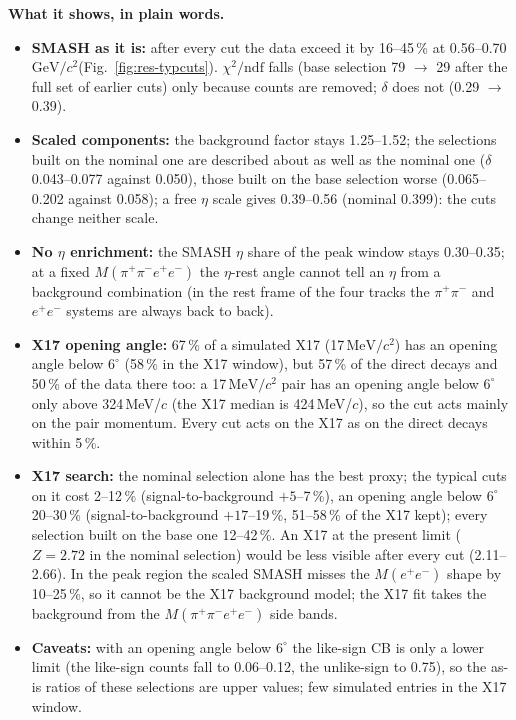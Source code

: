 \documentclass[11pt,a4paper]{article}
\newcommand{\ee}{\ensuremath{e^{+}e^{-}}\xspace}
\newcommand{\pipi}{\ensuremath{\pi^{+}\pi^{-}}\xspace}
\newcommand{\Mfour}{\ensuremath{M(\pi^{+}\pi^{-}e^{+}e^{-})}\xspace}
\newcommand{\Mee}{\ensuremath{M(e^{+}e^{-})}\xspace}
\newcommand{\GeVcc}{\ensuremath{\mathrm{GeV}/c^{2}}\xspace}
\newcommand{\MeVcc}{\ensuremath{\mathrm{MeV}/c^{2}}\xspace}
\begin{document}
\textbf{What it shows, in plain words.}
\begin{itemize}\setlength{\itemsep}{0pt}
\item \textbf{SMASH as it is:} after every cut the data exceed it by 16--45\,\% at 0.56--0.70\,\GeVcc (Fig.~\ref{fig:res-typcuts}). $\chi^2/\mathrm{ndf}$
      falls (base selection 79 $\to$ 29 after the full set of earlier cuts) only because counts are removed; $\delta$ does not (0.29 $\to$ 0.39).
\item \textbf{Scaled components:} the background factor stays 1.25--1.52; the selections built on the nominal one are described about as well as
      the nominal one ($\delta$ 0.043--0.077 against 0.050), those built on the base selection worse (0.065--0.202 against 0.058); a free $\eta$
      scale gives 0.39--0.56 (nominal 0.399): the cuts change neither scale.
\item \textbf{No $\eta$ enrichment:} the SMASH $\eta$ share of the peak window stays 0.30--0.35; at a fixed \Mfour the $\eta$-rest angle cannot tell an
      $\eta$ from a background combination (in the rest frame of the four tracks the \pipi and \ee systems are always back to back).
\item \textbf{X17 opening angle:} 67\,\% of a simulated X17 (17\,\MeVcc) has an opening angle below $6^\circ$ (58\,\% in the X17 window), but 57\,\% of
      the direct decays and 50\,\% of the data there too: a 17\,\MeVcc pair has an opening angle below $6^\circ$ only above 324\,MeV/$c$ (the X17
      median is 424\,MeV/$c$), so the cut acts mainly on the pair momentum. Every cut acts on the X17 as on the direct decays within 5\,\%.
\item \textbf{X17 search:} the nominal selection alone has the best proxy; the typical cuts on it cost 2--12\,\% (signal-to-background $+5$--7\,\%),
      an opening angle below $6^\circ$ 20--30\,\% (signal-to-background $+17$--19\,\%, 51--58\,\% of the X17 kept); every selection built on the base one
      12--42\,\%. An X17 at the present limit ($Z=2.72$ in the nominal selection) would be less visible after every cut (2.11--2.66). In the peak region
      the scaled SMASH misses the \Mee shape by 10--25\,\%, so it cannot be the X17 background model; the X17 fit takes the background from the \Mfour side bands.
\item \textbf{Caveats:} with an opening angle below $6^\circ$ the like-sign CB is only a lower limit (the like-sign counts fall to 0.06--0.12, the
      unlike-sign to 0.75), so the as-is ratios of these selections are upper values; few simulated entries in the X17 window.
\end{itemize}
\end{document}
